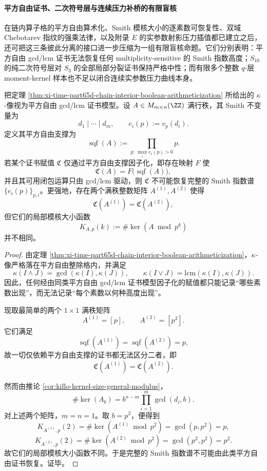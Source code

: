\paragraph{平方自由证书、二次符号层与连续压力补桥的有限盲核}
在链内算子格的平方自由算术化、Smith 模核大小的逐素数可恢复性、双域 Chebotarev 指纹的强乘法律，以及附录 \(E\) 的实参数射影压力插值都已建立之后，还可把这三条彼此分离的接口进一步压缩为一组有限盲核命题。它们分别表明：平方自由 gcd/lcm 证书无法恢复任何 multiplicity-sensitive 的 Smith 指数高度；\(S_{10}\) 的纯二次符号层对 \(S_3\) 的全部局部分裂证书保持严格中性；而有限多个整数 \(q\)-层 moment-kernel 样本也不足以闭合连续实参数压力曲线本身。

\begin{theorem}\label{thm:xi-time-part9xg-squarefree-certificate-blindness-to-smith-heights}
把定理 \ref{thm:xi-time-part65d-chain-interior-boolean-arithmeticization} 所给出的 \(\kappa\)-像视为平方自由 gcd/lcm 证书模型。设 \(A\in M_{m\times n}(\ZZ)\) 满行秩，其 Smith 不变量为
\[
d_1\mid \cdots \mid d_m,
\qquad
e_i(p):=v_p(d_i).
\]
定义其平方自由支撑为
\[
\operatorname{sqf}(A):=\prod_{p:\,\max_i e_i(p)>0}p.
\]
若某个证书赋值 \(\mathfrak C\) 仅通过平方自由支撑因子化，即存在映射 \(F\) 使
\[
\mathfrak C(A)=F\!\bigl(\operatorname{sqf}(A)\bigr),
\]
并且其可用闭包运算只由 gcd/lcm 驱动，则 \(\mathfrak C\) 不可能恢复完整的 Smith 指数谱 \(\{e_i(p)\}_{p,i}\)。更强地，存在两个满秩整数矩阵 \(A^{(1)},A^{(2)}\) 使得
\[
\mathfrak C(A^{(1)})=\mathfrak C(A^{(2)}),
\]
但它们的局部模核大小函数
\[
K_{A,p}(k):=\#\ker(A\bmod p^k)
\]
并不相同。
\end{theorem}
\begin{proof}
由定理 \ref{thm:xi-time-part65d-chain-interior-boolean-arithmeticization}，\(\kappa\)-像严格落在平方自由整除格内，并满足
\[
\kappa(I\wedge J)=\gcd(\kappa(I),\kappa(J)),
\qquad
\kappa(I\vee J)=\mathrm{lcm}(\kappa(I),\kappa(J)).
\]
因此，任何经由同类平方自由 gcd/lcm 证书模型因子化的赋值都只能记录“哪些素数出现”，而无法记录“每个素数以何种高度出现”。

现取最简单的两个 \(1\times 1\) 满秩矩阵
\[
A^{(1)}=[p],
\qquad
A^{(2)}=[p^2].
\]
它们满足
\[
\operatorname{sqf}(A^{(1)})=\operatorname{sqf}(A^{(2)})=p,
\]
故一切仅依赖平方自由支撑的证书都无法区分二者，即
\[
\mathfrak C(A^{(1)})=\mathfrak C(A^{(2)}).
\]

然而由推论 \ref{cor:killo-kernel-size-general-modulus}，
\[
\#\ker(A_b)=b^{n-m}\prod_{i=1}^{m}\gcd(d_i,b).
\]
对上述两个矩阵，\(m=n=1\)。取 \(b=p^2\)，便得到
\[
K_{A^{(1)},p}(2)=\#\ker(A^{(1)}\bmod p^2)=\gcd(p,p^2)=p,
\]
\[
K_{A^{(2)},p}(2)=\#\ker(A^{(2)}\bmod p^2)=\gcd(p^2,p^2)=p^2.
\]
故它们的局部模核大小函数不同。于是完整的 Smith 指数谱不可能由此类平方自由证书恢复。证毕。
\end{proof}

